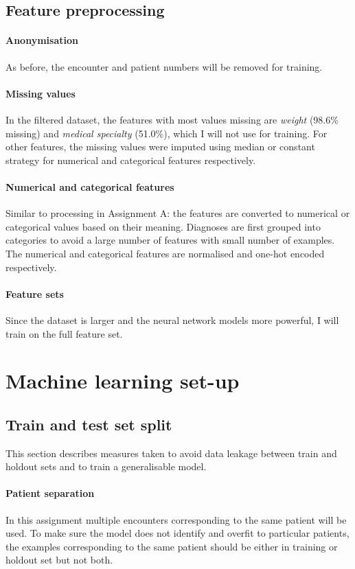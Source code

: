 \documentclass[10pt, twocolumn]{article}
\begin{document}
\subsection{Feature preprocessing}
\paragraph{Anonymisation} As before, the encounter and patient numbers will be removed for training.

\paragraph{Missing values} In the filtered dataset, the features with most values missing are \textit{weight} (98.6\% missing) and \textit{medical specialty} (51.0\%), which I will not use for training. For other features, the missing values were imputed using median or constant strategy for numerical and categorical features respectively.

\paragraph{Numerical and categorical features} Similar to processing in Assignment A: the features are converted to numerical or categorical values based on their meaning. Diagnoses are first grouped into categories to avoid a large number of features with small number of examples. The numerical and categorical features are normalised and one-hot encoded respectively.

\paragraph{Feature sets} Since the dataset is larger and the neural network models more powerful, I will train on the full feature set.

\section{Machine learning set-up}

\subsection{Train and test set split}
This section describes measures taken to avoid data leakage between train and holdout sets and to train a generalisable model.

\paragraph{Patient separation} In this assignment multiple encounters corresponding to the same patient will be used. To make sure the model does not identify and overfit to particular patients, the examples corresponding to the same patient should be either in training or holdout set but not both.
\end{document}
